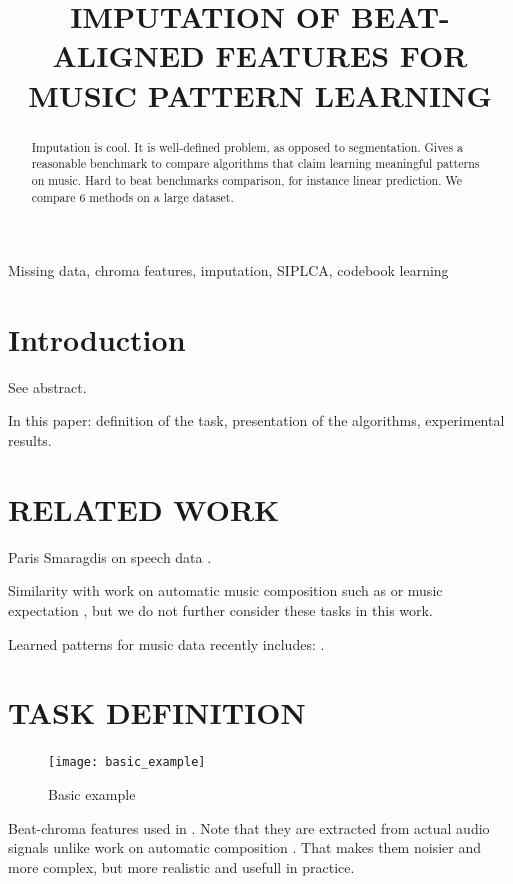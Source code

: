 \documentclass{article}
\title{IMPUTATION OF BEAT-ALIGNED FEATURES FOR MUSIC PATTERN LEARNING}
\begin{document}
%
\maketitle
%
\begin{abstract}
Imputation is cool. It is well-defined problem, as opposed to segmentation.
Gives a reasonable benchmark to compare algorithms that claim learning meaningful
patterns on music. Hard to beat benchmarks comparison, for instance linear
prediction. We compare 6 methods on a large dataset.
\end{abstract}
%
\begin{keywords}
Missing data, chroma features, imputation, SIPLCA, codebook learning
\end{keywords}
%
\section{Introduction}
\label{sec:intro}

See abstract.

In this paper: definition of the task, presentation of the algorithms, experimental
results.

\section{RELATED WORK}
\label{sec:relatedwork}

Paris Smaragdis on speech data \cite{Smaragdis2009}.

Similarity with work on automatic music composition such as \cite{Eck2002d,Mozer1994a} or music
expectation \cite{Hazan2010}, but we do not further consider these tasks in this work.

Learned patterns for music data recently includes: \cite{Bertin-Mahieux2010a,Casey2007,Weiss2010}.

\section{TASK DEFINITION}
\label{sec:task}

\begin{figure}[t]
\begin{center}
\texttt{[image: basic\_example]}
\end{center}
\caption{Basic example}
\label{fig:code}
\end{figure}

Beat-chroma features used in \cite{Ellis2007a}.
Note that they are extracted from actual audio signals unlike work on automatic composition
\cite{Eck2002d}. That makes them noisier and more complex, but more realistic and usefull
in practice.
\end{document}
